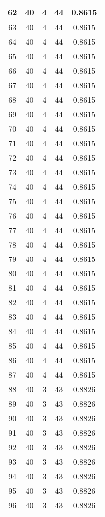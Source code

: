 \documentclass[letterpaper, 12pt]{article}
\begin{document}
\begin{longtable}{|c|c|c|c|c|}
\hline
62 & 40 & 4 & 44 & 0.8615 \\
\hline
63 & 40 & 4 & 44 & 0.8615 \\
\hline
64 & 40 & 4 & 44 & 0.8615 \\
\hline
65 & 40 & 4 & 44 & 0.8615 \\
\hline
66 & 40 & 4 & 44 & 0.8615 \\
\hline
67 & 40 & 4 & 44 & 0.8615 \\
\hline
68 & 40 & 4 & 44 & 0.8615 \\
\hline
69 & 40 & 4 & 44 & 0.8615 \\
\hline
70 & 40 & 4 & 44 & 0.8615 \\
\hline
71 & 40 & 4 & 44 & 0.8615 \\
\hline
72 & 40 & 4 & 44 & 0.8615 \\
\hline
73 & 40 & 4 & 44 & 0.8615 \\
\hline
74 & 40 & 4 & 44 & 0.8615 \\
\hline
75 & 40 & 4 & 44 & 0.8615 \\
\hline
76 & 40 & 4 & 44 & 0.8615 \\
\hline
77 & 40 & 4 & 44 & 0.8615 \\
\hline
78 & 40 & 4 & 44 & 0.8615 \\
\hline
79 & 40 & 4 & 44 & 0.8615 \\
\hline
80 & 40 & 4 & 44 & 0.8615 \\
\hline
81 & 40 & 4 & 44 & 0.8615 \\
\hline
82 & 40 & 4 & 44 & 0.8615 \\
\hline
83 & 40 & 4 & 44 & 0.8615 \\
\hline
84 & 40 & 4 & 44 & 0.8615 \\
\hline
85 & 40 & 4 & 44 & 0.8615 \\
\hline
86 & 40 & 4 & 44 & 0.8615 \\
\hline
87 & 40 & 4 & 44 & 0.8615 \\
\hline
88 & 40 & 3 & 43 & 0.8826 \\
\hline
89 & 40 & 3 & 43 & 0.8826 \\
\hline
90 & 40 & 3 & 43 & 0.8826 \\
\hline
91 & 40 & 3 & 43 & 0.8826 \\
\hline
92 & 40 & 3 & 43 & 0.8826 \\
\hline
93 & 40 & 3 & 43 & 0.8826 \\
\hline
94 & 40 & 3 & 43 & 0.8826 \\
\hline
95 & 40 & 3 & 43 & 0.8826 \\
\hline
96 & 40 & 3 & 43 & 0.8826 \\

\end{longtable}
\end{document}
